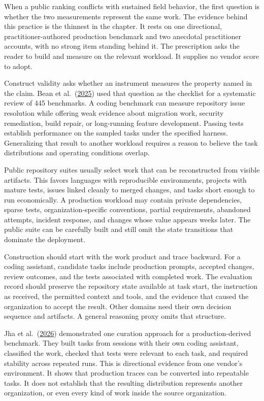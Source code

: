 When a public ranking conflicts with sustained field behavior, the first question is whether the two measurements represent the same work. The evidence behind this practice is the thinnest in the chapter. It rests on one directional, practitioner-authored production benchmark and two anecdotal practitioner accounts, with no strong item standing behind it. The prescription asks the reader to build and measure on the relevant workload. It supplies no vendor score to adopt.

Construct validity asks whether an instrument measures the property named in the claim. Bean et al.~(\href{https://arxiv.org/abs/2511.04703}{2025}) used that question as the checklist for a systematic review of 445 benchmarks. A coding benchmark can measure repository issue resolution while offering weak evidence about migration work, security remediation, build repair, or long-running feature development. Passing tests establish performance on the sampled tasks under the specified harness. Generalizing that result to another workload requires a reason to believe the task distributions and operating conditions overlap.

Public repository suites usually select work that can be reconstructed from visible artifacts. This favors languages with reproducible environments, projects with mature tests, issues linked cleanly to merged changes, and tasks short enough to run economically. A production workload may contain private dependencies, sparse tests, organization-specific conventions, partial requirements, abandoned attempts, incident response, and changes whose value appears weeks later. The public suite can be carefully built and still omit the state transitions that dominate the deployment.

Construction should start with the work product and trace backward. For a coding assistant, candidate tasks include production prompts, accepted changes, review outcomes, and the tests associated with completed work. The evaluation record should preserve the repository state available at task start, the instruction as received, the permitted context and tools, and the evidence that caused the organization to accept the result. Other domains need their own decision sequence and artifacts. A general reasoning proxy omits that structure.

Jha et al.~(\href{https://arxiv.org/abs/2604.01527}{2026}) demonstrated one curation approach for a production-derived benchmark. They built tasks from sessions with their own coding assistant, classified the work, checked that tests were relevant to each task, and required stability across repeated runs. This is directional evidence from one vendor's environment. It shows that production traces can be converted into repeatable tasks. It does not establish that the resulting distribution represents another organization, or even every kind of work inside the source organization.

